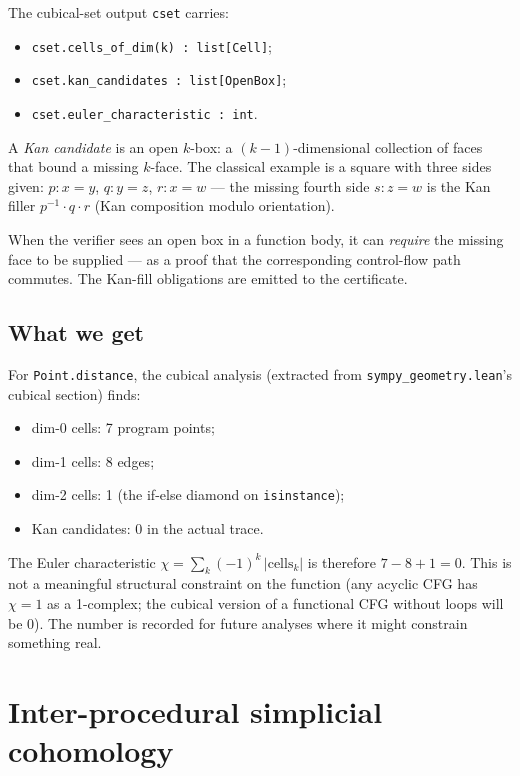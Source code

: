 The cubical-set output \texttt{cset} carries:
\begin{itemize}[leftmargin=1.7em]
  \item \texttt{cset.cells\_of\_dim(k) : list[Cell]};
  \item \texttt{cset.kan\_candidates : list[OpenBox]};
  \item \texttt{cset.euler\_characteristic : int}.
\end{itemize}

A \emph{Kan candidate} is an open $k$-box: a $(k-1)$-dimensional
collection of faces that bound a missing $k$-face.  The classical
example is a square with three sides given:
$p : x = y$, $q : y = z$, $r : x = w$ --- the missing fourth side
$s : z = w$ is the Kan filler $p^{-1} \cdot q \cdot r$ (Kan
composition modulo orientation).

When the verifier sees an open box in a function body, it can
\emph{require} the missing face to be supplied --- as a proof that
the corresponding control-flow path commutes.  The Kan-fill
obligations are emitted to the certificate.

\subsection{What we get}

For \texttt{Point.distance}, the cubical analysis (extracted from
\texttt{sympy\_geometry.lean}'s cubical section) finds:
\begin{itemize}[leftmargin=1.7em]
  \item dim-0 cells: 7 program points;
  \item dim-1 cells: 8 edges;
  \item dim-2 cells: 1 (the if-else diamond on \texttt{isinstance});
  \item Kan candidates: 0 in the actual trace.
\end{itemize}

The Euler characteristic $\chi = \sum_k (-1)^k \,|\text{cells}_k|$
is therefore $7 - 8 + 1 = 0$.  This is not a meaningful structural
constraint on the function (any acyclic CFG has $\chi = 1$ as a
1-complex; the cubical version of a functional CFG without loops
will be $0$).  The number is recorded for future analyses where it
might constrain something real.

\section{Inter-procedural simplicial cohomology}
\label{sec:inter-simplicial}

